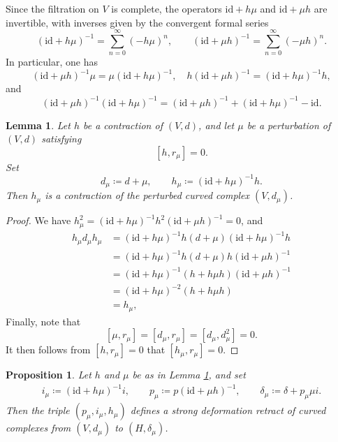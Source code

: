 \documentclass[12pt]{amsart}
\newtheorem{lem}[defn]{Lemma}
\newtheorem{prop}[defn]{Proposition}
\numberwithin{equation}{section}
\theoremstyle{plain}
\newcommand{\id}{\mathrm{id}}
\begin{document}
	Since the filtration on $V$ is complete, the operators $\id+h\mu$ and $\id+\mu h$ are invertible, with inverses given by the convergent formal series
	\[
	(\id+h\mu)^{-1}
	=
	\sum_{n=0}^{\infty}(-h\mu)^n,
	\qquad
	(\id+\mu h)^{-1}
	=
	\sum_{n=0}^{\infty}(-\mu h)^n.
	\]
	In particular, one has
	\[
	(\id+\mu h)^{-1}\mu
	=
	\mu(\id+h\mu)^{-1},
	\quad
	h(\id+\mu h)^{-1}
	=
	(\id+h\mu)^{-1}h,
	\]
	and
	\[
	(\id+\mu h)^{-1}(\id+ h \mu)^{-1} = (\id+\mu h)^{-1} + (\id+ h \mu)^{-1} - \id.
	\]
	\begin{lem}\label{sdrh}
		Let $h$ be a contraction of $(V,d)$, and let $\mu$ be a perturbation of $(V,d)$ satisfying
		\[
		[h,r_\mu]=0.
		\]
		Set
		\[
		d_\mu \coloneqq d+\mu,
		\qquad
		h_\mu \coloneqq (\id+h\mu)^{-1}h.
		\]
		Then $h_\mu$ is a contraction of the perturbed curved complex $(V,d_\mu)$.
	\end{lem}
	\begin{proof}
		We have $h_\mu^2 = (\id + h\mu)^{-1} h^2 (\id + \mu h)^{-1} = 0$, and
		\begin{align*}
			h_\mu d_\mu h_\mu &= (\id + h\mu)^{-1} h(d+\mu) (\id + h\mu)^{-1} h \\
			&= (\id+ h\mu)^{-1}h (d+\mu) h(\id + \mu h)^{-1} \\
			&= (\id+ h\mu)^{-1}(h+h\mu h)(\id + \mu h)^{-1} \\
			&= (\id+ h\mu)^{-2}(h+h\mu h) \\
			&= h_\mu,
		\end{align*}
		Finally, note that
		\[
		[\mu, r_\mu] = [d_\mu, r_\mu] = [d_\mu, d_\mu^2]=0.
		\]
		It then follows from $[h, r_\mu]=0$ that $[h_\mu, r_\mu]=0$.
	\end{proof}

	
	\begin{prop}%
		Let $h$ and $\mu$ be as in Lemma \ref{sdrh}, and set
		\begin{align*}
			i_\mu \coloneqq (\id + h\mu)^{-1} i, 
			\qquad
			p_\mu \coloneqq p(\id + \mu h)^{-1},
			\qquad 
			\delta_\mu \coloneqq \delta + p_\mu \mu i.
		\end{align*}
		Then the triple $(p_\mu,i_\mu,h_\mu)$ defines a strong deformation retract of curved complexes from $(V,d_\mu)$ to $(H,\delta_\mu)$.
	\end{prop}
	
\end{document}
